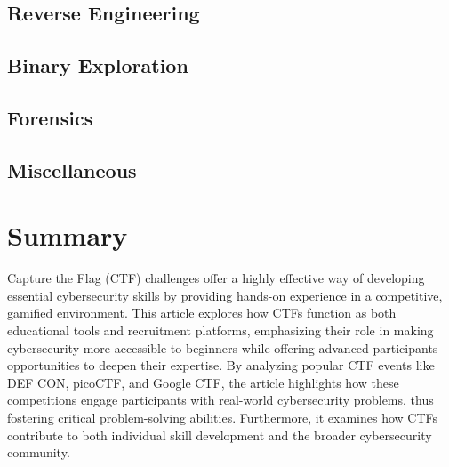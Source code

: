 \documentclass[conference]{IEEEtran}
\begin{document}
\subsection{Reverse Engineering}

\subsection{Binary Exploration}

\cite{lhee2003}

\cite{stallman1988}

\subsection{Forensics}

\cite{ndatinya2015}


\subsection{Miscellaneous}

\section{Summary}

Capture the Flag (CTF) challenges offer a highly effective way of developing
essential cybersecurity skills by providing hands-on experience in a
competitive, gamified environment. This article explores how CTFs function as
both educational tools and recruitment platforms, emphasizing their role in
making cybersecurity more accessible to beginners while offering advanced
participants opportunities to deepen their expertise. By analyzing popular CTF
events like DEF CON, picoCTF, and Google CTF, the article highlights how these
competitions engage participants with real-world cybersecurity problems, thus
fostering critical problem-solving abilities. Furthermore, it examines how CTFs
contribute to both individual skill development and the broader cybersecurity
community.



\end{document}
